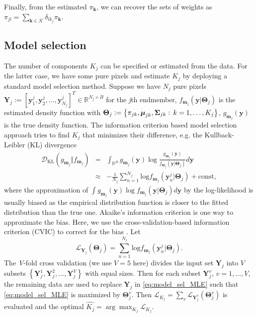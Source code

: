 \documentclass[twocolumn,english]{IEEEtran}
\theoremstyle{plain}
\begin{document}
Finally, from the estimated $\pi_{\mathbf{k}}$, we can recover the
sets of weights as $\pi_{jl}=\sum_{\mathbf{k}\in\mathcal{K}}\delta_{lk_{j}}\pi_{\mathbf{k}}$.

\subsection{Model selection\label{subsec:Model-selection}}

The number of components $K_{j}$ can be specified or estimated from
the data. For the latter case, we have some pure pixels and estimate
$K_{j}$ by deploying a standard model selection method. Suppose we
have $N_{j}$ pure pixels $\mathbf{Y}_{j}:=\left[\mathbf{y}_{1}^{j},\mathbf{y}_{2}^{j},\dots,\mathbf{y}_{N_{j}}^{j}\right]^{T}\in\mathbb{R}^{N_{j}\times B}$
for the \emph{j}th endmember, $f_{\mathbf{m}_{j}}\left(\mathbf{y}\vert\boldsymbol{\Theta}_{j}\right)$
is the estimated density function with $\boldsymbol{\Theta}_{j}\vcentcolon=\left\{ \pi_{jk},\boldsymbol{\mu}_{jk},\boldsymbol{\Sigma}_{jk}:\,k=1,\dots,K_{j}\right\} $,
$g_{\mathbf{m}_{j}}\left(\mathbf{y}\right)$ is the true density function.
The information criterion based model selection approach tries to
find $K_{j}$ that minimizes their difference, e.g. the Kullback-Leibler
(KL) divergence
\begin{eqnarray*}
\mathcal{D}_{\text{KL}}\left(g_{\mathbf{m}_{j}}\Vert f_{\mathbf{m}_{j}}\right) & = & \int_{\mathbb{R}^{B}}g_{\mathbf{m}_{j}}\left(\mathbf{y}\right)\log\frac{g_{\mathbf{m}_{j}}\left(\mathbf{y}\right)}{f_{\mathbf{m}_{j}}\left(\mathbf{y}\vert\boldsymbol{\Theta}_{j}\right)}d\mathbf{y}\\
 & \approx & -\frac{1}{N_{j}}\sum_{n=1}^{N_{j}}\text{log}f_{\mathbf{m}_{j}}\left(\mathbf{y}_{n}^{j}\vert\boldsymbol{\Theta}_{j}\right)+\text{const},
\end{eqnarray*}
where the approximation of $\int g_{\mathbf{m}_{j}}\left(\mathbf{y}\right)\log f_{\mathbf{m}_{j}}\left(\mathbf{y}\vert\boldsymbol{\Theta}_{j}\right)d\mathbf{y}$
by the log-likelihood is usually biased as the empirical distribution
function is closer to the fitted distribution than the true one. Akaike's
information criterion is one way to approximate the bias. Here, we
use the cross-validation-based information criterion (CVIC) to correct
for the bias \cite{mclachlan2014number,smyth2000model}. Let
\begin{equation}
\mathcal{L}_{\mathbf{Y}_{j}}\left(\boldsymbol{\Theta}_{j}\right)=\sum_{n=1}^{N_{j}}\text{log}f_{\mathbf{m}_{j}}\left(\mathbf{y}_{n}^{j}\vert\boldsymbol{\Theta}_{j}\right).\label{eq:model_sel_MLE}
\end{equation}
The \emph{V}-fold cross validation (we use $V=5$ here) divides the
input set $\mathbf{Y}_{j}$ into $V$ subsets $\left\{ \mathbf{Y}_{j}^{1},\mathbf{Y}_{j}^{2},\dots,\mathbf{Y}_{j}^{V}\right\} $
with equal sizes. Then for each subset $\mathbf{Y}_{j}^{v}$, $v=1,\dots,V$,
the remaining data are used to replace $\mathbf{Y}_{j}$ in \eqref{eq:model_sel_MLE}
such that \eqref{eq:model_sel_MLE} is maximized by $\boldsymbol{\Theta}_{j}^{v}$.
Then $\mathcal{L}_{K_{j}}=\sum_{v}\mathcal{L}_{\mathbf{Y}_{j}^{v}}\left(\boldsymbol{\Theta}_{j}^{v}\right)$
is evaluated and the optimal $\hat{K_{j}}=\arg\max_{K_{j}}\mathcal{L}_{K_{j}}$. 
\end{document}
